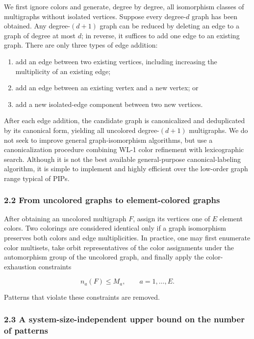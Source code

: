 We first ignore colors and generate, degree by degree, all isomorphism classes of multigraphs without isolated vertices. Suppose every degree-\(d\) graph has been obtained. Any degree-\((d+1)\) graph can be reduced by deleting an edge to a graph of degree at most \(d\); in reverse, it suffices to add one edge to an existing graph. There are only three types of edge addition:

\begin{enumerate}
\def\labelenumi{\arabic{enumi}.}
\tightlist
\item add an edge between two existing vertices, including increasing the multiplicity of an existing edge;
\item add an edge between an existing vertex and a new vertex; or
\item add a new isolated-edge component between two new vertices.
\end{enumerate}

After each edge addition, the candidate graph is canonicalized and deduplicated by its canonical form, yielding all uncolored degree-\((d+1)\) multigraphs. We do not seek to improve general graph-isomorphism algorithms, but use a canonicalization procedure combining WL-1 color refinement with lexicographic search. Although it is not the best available general-purpose canonical-labeling algorithm, it is simple to implement and highly efficient over the low-order graph range typical of PIPs.

\subsubsection{2.2 From uncolored graphs to element-colored graphs}\label{sec:graph-coloring}

After obtaining an uncolored multigraph \(F\), assign its vertices one of \(E\) element colors. Two colorings are considered identical only if a graph isomorphism preserves both colors and edge multiplicities. In practice, one may first enumerate color multisets, take orbit representatives of the color assignments under the automorphism group of the uncolored graph, and finally apply the color-exhaustion constraints

\[
n_a(F)\le M_a,
\qquad a=1,\ldots,E.
\]

Patterns that violate these constraints are removed.

\subsubsection{2.3 A system-size-independent upper bound on the number of patterns}\label{sec:pattern-bound}


